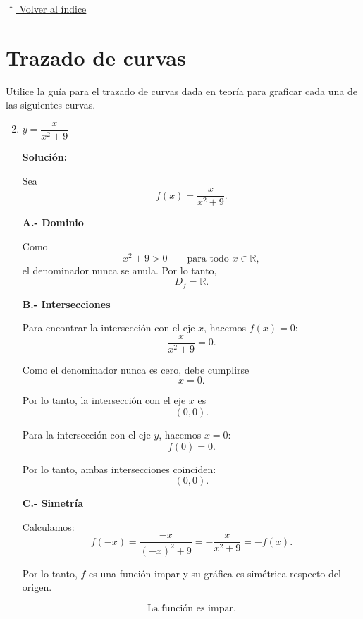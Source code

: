 \documentclass[12pt]{article}
\newcommand{\solucion}{%
    \vspace{0.8em}%
    \textbf{Solución:}%
}
\newcommand{\volverindice}{%
    \vspace{1em}%
    \begin{flushright}%
        \hyperlink{indice}{\small $\uparrow$ Volver al índice}%
    \end{flushright}%
}
\begin{document}
\volverindice
\newpage


\section{Trazado de curvas}

Utilice la guía para el trazado de curvas dada en teoría para graficar cada una de las siguientes curvas.

\begin{enumerate}[label=\alph*.-]

    \setcounter{enumi}{1} %


    \item $y = \dfrac{x}{x^2 + 9}$

    \solucion

    Sea
    \[
    f(x)=\frac{x}{x^2+9}.
    \]

    \textbf{A.- Dominio}

    Como
    \[
    x^2+9>0
    \qquad\text{para todo }x\in\mathbb{R},
    \]
    el denominador nunca se anula. Por lo tanto,
    \[
    \boxed{D_f=\mathbb{R}}.
    \]

    \textbf{B.- Intersecciones}

    Para encontrar la intersección con el eje $x$, hacemos $f(x)=0$:
    \[
    \frac{x}{x^2+9}=0.
    \]

    Como el denominador nunca es cero, debe cumplirse
    \[
    x=0.
    \]

    Por lo tanto, la intersección con el eje $x$ es
    \[
    (0,0).
    \]

    Para la intersección con el eje $y$, hacemos $x=0$:
    \[
    f(0)=0.
    \]

    Por lo tanto, ambas intersecciones coinciden:
    \[
    \boxed{(0,0)}.
    \]

				\newpage
    \textbf{C.- Simetría}

    Calculamos:
    \[
    f(-x)
    =
    \frac{-x}{(-x)^2+9}
    =
    -\frac{x}{x^2+9}
    =
    -f(x).
    \]

    Por lo tanto, $f$ es una función impar y su gráfica es simétrica
    respecto del origen.

    \[
    \boxed{\text{La función es impar.}}
    \]


\end{enumerate}
\end{document}
